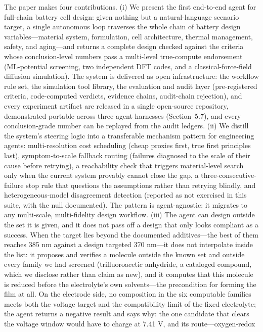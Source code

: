 The paper makes four contributions. (i) We present the first end-to-end
agent for full-chain battery cell design: given nothing but a
natural-language scenario target, a single autonomous loop traverses
the whole chain of battery design variables---material system, formulation,
cell architecture, thermal management, safety, and aging---and returns a
complete design checked against the criteria whose conclusion-level numbers pass a
multi-level true-compute endorsement (ML-potential screening, two
independent DFT codes, and a classical-force-field diffusion simulation).
The system is delivered as open infrastructure: the workflow rule set,
the simulation tool library, the evaluation and audit layer
(pre-registered criteria, code-computed verdicts, evidence chains,
audit-chain rejection), and every experiment artifact are released in a
single open-source repository, demonstrated portable across three agent
harnesses (Section~5.7), and every conclusion-grade number can be
replayed from the audit ledgers. (ii) We distill the
system's steering logic into a transferable mechanism pattern for
engineering agents: multi-resolution cost scheduling (cheap proxies
first, true first principles last), symptom-to-scale fallback routing
(failures diagnosed to the scale of their cause before retrying), a
reachability check that triggers material-level search only when the
current system provably cannot close the gap, a three-consecutive-failure
stop rule that questions the assumptions rather than retrying blindly, and
heterogeneous-model disagreement detection (reported as not exercised in
this suite, with the null documented). The pattern is agent-agnostic: it
migrates to any multi-scale, multi-fidelity design workflow. (iii) The agent can design outside the set it is
given, and it does not pass off a design that only looks compliant as a
success. When the target lies beyond the documented additives---the best of
them reaches 385 nm against a design targeted 370 nm---it does not interpolate
inside the list: it proposes and verifies a molecule outside the known set
and outside every family we had screened (trifluoroacetic anhydride, a
cataloged compound, which we disclose rather than claim as new), and it
computes that this molecule is reduced before the electrolyte's own
solvents---the precondition for forming the film at all. On the electrode
side, no composition in the six computable families meets both the voltage
target and the compatibility limit of the fixed electrolyte; the agent
returns a negative result and says why: the one candidate that clears the
voltage window would have to charge at 7.41 V, and its route---oxygen-redox
